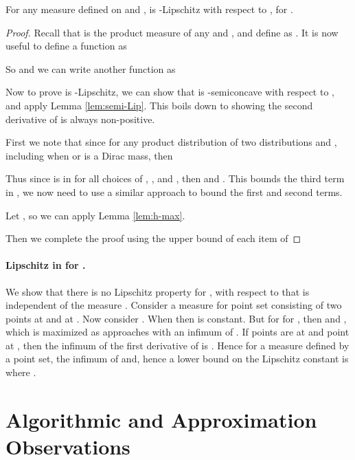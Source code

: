 \documentclass[11pt]{myclass}
\begin{document}
\begin{theorem}
\label{thm:sigma-Lip}
For any measure  defined on  and ,  is -Lipschitz with respect to , for .
\end{theorem}
\begin{proof}
Recall that  is the product measure of any  and , and
define  as .  
It is now useful to define a function  as  

So  and we can write another function as

Now to prove   is -Lipschitz, we can show that  is -semiconcave with respect to , and apply Lemma \ref{lem:semi-Lip}.  This boils down to showing the second derivative of  is always non-positive.  




First we note that since  for any product distribution  of two distributions  and , including when  or  is a Dirac mass, then 

Thus since  is in  for all choices of , , and , then  and .  This bounds the third term in , we now need to use a similar approach to bound the first and second terms.  

Let , so we can apply Lemma \ref{lem:h-max}.







Then we complete the proof using the upper bound of each item of 

\end{proof}

\paragraph{Lipschitz in  for .}
We show that there is no Lipschitz property for , with respect to  that is independent of the measure .  
Consider a measure  for point set  consisting of two points at  and at .
Now consider .  When  then  is constant.  But for  for , then  and 
, which is maximized as  approaches  with an infimum of .  
If  points are at  and  point at , then the infimum of the first derivative of  is .  
Hence for a measure  defined by a point set, the infimum of  and, hence a lower bound on the Lipschitz constant is  where .  









\section{Algorithmic and Approximation Observations}
\label{sec:algo}
\end{document}
